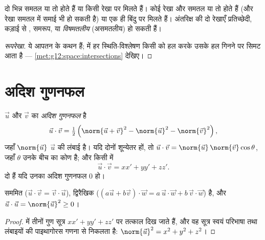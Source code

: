 \begin{proposition}[सापेक्ष स्थितियाँ]\label{prop:g12:space:positions}
दो भिन्न समतल या तो  होते हैं या किसी रेखा पर मिलते हैं। कोई रेखा और
समतल या तो  होते हैं (और रेखा समतल में समाई भी हो सकती है) या एक ही
बिंदु पर मिलते हैं। अंतरिक्ष की दो रेखाएँ प्रतिच्छेदी, कड़ाई से , समरूप,
या \emph{विषमतलीय} (असमतलीय) हो सकती हैं।
\end{proposition}

\begin{proof}[रूपरेखा]
ये आपतन के कथन हैं;  में हर स्थिति-विश्लेषण किसी  को
हल करके उसके हल गिनने पर सिमट आता है --- \cref{met:g12:space:intersections} देखिए।
\end{proof}

\section{अदिश गुणनफल}

\begin{definition}[अदिश गुणनफल]\label{def:g12:space:dot}
$\vec u$ और $\vec v$ का \emph{अदिश गुणनफल} है
\[
\vec u \cdot \vec v = \tfrac12\left(\norm{\vec u + \vec v}^2
- \norm{\vec u}^2 - \norm{\vec v}^2\right),
\]
जहाँ $\norm{\vec u}$ $\vec u$ की लंबाई है। यदि दोनों  शून्येतर हों, तो $\vec u \cdot \vec v = \norm{\vec u}\,\norm{\vec v}\cos\theta$, जहाँ $\theta$
उनके बीच का कोण है; और किसी \emph{}  में
\[
\vec u \cdot \vec v = xx' + yy' + zz' .
\]
दो  \emph{} हैं यदि उनका अदिश गुणनफल $0$ हो।
\end{definition}

\begin{proposition}[गुण]\label{prop:g12:space:dotprops}
 सममित ($\vec u\cdot\vec v = \vec v\cdot\vec u$), द्विरैखिक ($(a\vec u + b\vec v)\cdot \vec w = a\,\vec u\cdot\vec w +
b\,\vec v\cdot \vec w$) है, और $\vec u \cdot \vec u = \norm{\vec u}^2 \geq 0$।
\end{proposition}

\begin{proof}
 में तीनों गुण सूत्र $xx' + yy' + zz'$ पर तत्काल दिख जाते हैं, और वह सूत्र
स्वयं परिभाषा तथा लंबाइयों की पाइथागोरस गणना से निकलता है: $\norm{\vec u}^2 = x^2 + y^2 + z^2$।
\end{proof}

